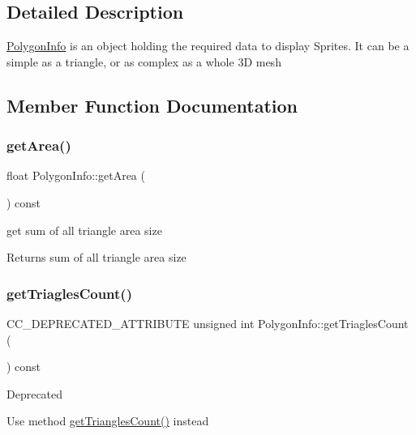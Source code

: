 \subsection{Detailed Description}
\hyperlink{classPolygonInfo}{Polygon\+Info} is an object holding the required data to display Sprites. It can be a simple as a triangle, or as complex as a whole 3D mesh 

\subsection{Member Function Documentation}
\mbox{\label{classPolygonInfo_gae6fa5ff93a6637153aa41a755486c21b}} 
\subsubsection{\texorpdfstring{get\+Area()}{getArea()}}
{\footnotesize\ttfamily float Polygon\+Info\+::get\+Area (\begin{DoxyParamCaption}{ }\end{DoxyParamCaption}) const}

get sum of all triangle area size \begin{DoxyReturn}{Returns}
sum of all triangle area size 
\end{DoxyReturn}
\mbox{\label{classPolygonInfo_ga29950bcfeaeaa13bca256166562caabc}} 
\subsubsection{\texorpdfstring{get\+Triagles\+Count()}{getTriaglesCount()}}
{\footnotesize\ttfamily C\+C\+\_\+\+D\+E\+P\+R\+E\+C\+A\+T\+E\+D\+\_\+\+A\+T\+T\+R\+I\+B\+U\+TE unsigned int Polygon\+Info\+::get\+Triagles\+Count (\begin{DoxyParamCaption}{ }\end{DoxyParamCaption}) const}

\begin{DoxyRefDesc}{Deprecated}
\item[\hyperlink{deprecated__deprecated000253}{Deprecated}]Use method \hyperlink{group____2d_ga0ca8e8c33d34a16c1f8cf33d13aeea2b}{get\+Triangles\+Count()} instead \end{DoxyRefDesc}
\mbox{\label{classPolygonInfo_ga0ca8e8c33d34a16c1f8cf33d13aeea2b}} 
